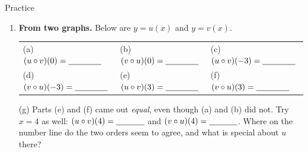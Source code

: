 \documentclass[10pt]{article}
\newcommand{\lgrid}[4]{%
  \draw[step=1, linegray!40, very thin] (#1,#3) grid (#2,#4);
  \draw[->, semithick, charcoal] (#1,0)--(#2,0) node[below right, font=\scriptsize]{$x$};
  \draw[->, semithick, charcoal] (0,#3)--(0,#4) node[left, font=\scriptsize]{$y$};}
\begin{document}
\begin{notesbox}{Practice}
\begin{enumerate}[leftmargin=1.9em, itemsep=11pt]
  \item \textbf{From two graphs.} Below are $y=u(x)$ and $y=v(x)$.
    \begin{center}
    \begin{minipage}[c]{0.47\linewidth}
    \centering
    \end{minipage}
    \hfill
    \begin{minipage}[c]{0.47\linewidth}
    \centering
    \end{minipage}
    \end{center}
    \begin{center}
    \renewcommand{\arraystretch}{1.7}
    \begin{tabularx}{\linewidth}{@{}X X X@{}}
    (a) \; $(u\circ v)(0)=\blank{1.4cm}$ &
    (b) \; $(v\circ u)(0)=\blank{1.4cm}$ &
    (c) \; $(u\circ v)(-3)=\blank{1.4cm}$ \\
    (d) \; $(v\circ u)(-3)=\blank{1.4cm}$ &
    (e) \; $(u\circ v)(3)=\blank{1.4cm}$ &
    (f) \; $(v\circ u)(3)=\blank{1.4cm}$ \\
    \end{tabularx}
    \end{center}
    (g) Parts (e) and (f) came out \emph{equal}, even though (a) and (b) did not. Try $x=4$ as
    well: $(u\circ v)(4)=\blank{1.2cm}$ and $(v\circ u)(4)=\blank{1.2cm}$. Where on the number line
    do the two orders seem to agree, and what is special about $u$ there? \blank{6.0cm}


\end{enumerate}
\end{notesbox}
\end{document}
